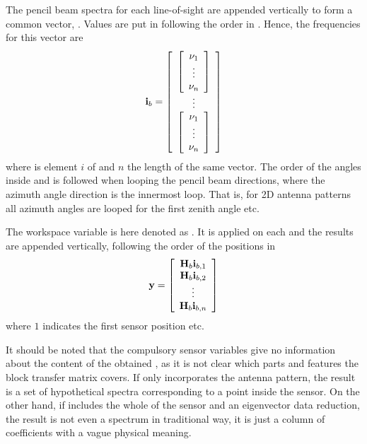 The pencil beam spectra for each line-of-sight are appended vertically to form
a common vector, . Values are put in following the order in
. Hence, the frequencies for this vector are
\begin{equation}
  \mathbf{i}_{b} = 
  \left[ \begin{array}{c} 
     \left[
          \begin{array}{c} \nu_{1}\\\vdots\\\nu_{n} \end{array} 
     \right] \\
     \vdots \\
     \left[
          \begin{array}{c} \nu_{1}\\\vdots\\\nu_{n} \end{array} 
     \right]
     \end{array} \right]
  \label{eq:fm_defs:freqs_of_ib}
\end{equation}
where  is element $i$ of  and $n$ the length of
the same vector. The order of the angles inside 
and  is followed when looping the pencil beam
directions, where the azimuth angle direction is the innermost loop.
That is, for 2D antenna patterns all azimuth angles are looped for the
first zenith angle etc. 

The workspace variable  is here denoted as
. It is applied on each  and the results are
appended vertically, following the order of the positions in
\begin{equation}
  \mathbf{y} = \left[ \begin{array}{c} \mathbf{H}_{b}\mathbf{i}_{{b,1}} \\ 
                                    \mathbf{H}_{b}\mathbf{i}_{{b,2}} \\
                                    \vdots                     \\
                                    \mathbf{H}_{b}\mathbf{i}_{{b,n}} 
            \end{array} \right]
  \label{eq:fm_defs:measseq}
\end{equation}
where $1$ indicates the first sensor position etc. 

It should be noted that the compulsory sensor variables give no
information about the content of the obtained \MsrVct, as it is not
clear which parts and features the block transfer matrix covers. If
 only incorporates the antenna pattern, the result is a set
of hypothetical spectra corresponding to a point inside the sensor. On
the other hand, if  includes the whole of the sensor and an
eigenvector data reduction, the result is not even a spectrum in
traditional way, it is just a column of coefficients with a vague
physical meaning.



